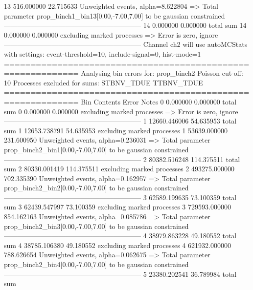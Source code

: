 13         516.000000      22.715633       Unweighted events, alpha=8.622804
  => Total parameter prop_binch1_bin13[0.00,-7.00,7.00] to be gaussian constrained
------------------------------------------------------------
14         0.000000        0.000000        total sum                     
14         0.000000        0.000000        excluding marked processes    
  => Error is zero, ignore      
------------------------------------------------------------
Channel ch2 will use autoMCStats with settings: event-threshold=10, include-signal=0, hist-mode=1
============================================================
Analysing bin errors for: prop_binch2
Poisson cut-off: 10
Processes excluded for sums: STBNV_TDUE TTBNV_TDUE
============================================================
Bin        Contents        Error           Notes                         
0          0.000000        0.000000        total sum                     
0          0.000000        0.000000        excluding marked processes    
  => Error is zero, ignore      
------------------------------------------------------------
1          12660.446006    54.635953       total sum                     
1          12653.738791    54.635953       excluding marked processes    
1          53639.000000    231.600950      Unweighted events, alpha=0.236031
  => Total parameter prop_binch2_bin1[0.00,-7.00,7.00] to be gaussian constrained
------------------------------------------------------------
2          80382.516248    114.375511      total sum                     
2          80330.001419    114.375511      excluding marked processes    
2          493275.000000   702.335390      Unweighted events, alpha=0.162957
  => Total parameter prop_binch2_bin2[0.00,-7.00,7.00] to be gaussian constrained
------------------------------------------------------------
3          62589.199635    73.100359       total sum                     
3          62439.547997    73.100359       excluding marked processes    
3          729593.000000   854.162163      Unweighted events, alpha=0.085786
  => Total parameter prop_binch2_bin3[0.00,-7.00,7.00] to be gaussian constrained
------------------------------------------------------------
4          38979.863228    49.180552       total sum                     
4          38785.106380    49.180552       excluding marked processes    
4          621932.000000   788.626654      Unweighted events, alpha=0.062675
  => Total parameter prop_binch2_bin4[0.00,-7.00,7.00] to be gaussian constrained
------------------------------------------------------------
5          23380.202541    36.789984       total sum                     
